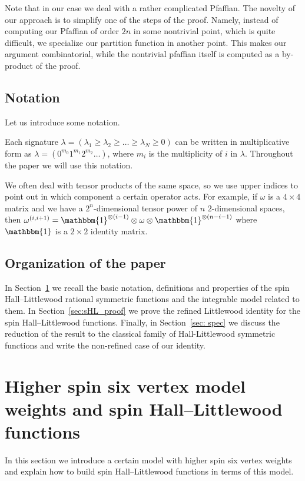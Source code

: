 Note that in our case we deal with a rather complicated Pfaffian. The novelty of our approach is to simplify one of the steps of the proof. Namely, instead of computing our Pfaffian of order $2n$ in some nontrivial point, which is quite difficult, we specialize our partition function in another point. This makes our argument combinatorial, while the nontrivial pfaffian itself is computed as a by-product of the proof.


\subsection{Notation}
\label{sec:not}

Let us introduce some notation.

Each signature $\lambda=(\lambda_1\ge \lambda_2\ge \ldots\ge \lambda_N\ge0 )$ can be written in multiplicative form as $\lambda=(0^{m_0} 1^{m_1} 2^{m_2} \dots)$, where $m_i$ is the multiplicity of $i$ in $\lambda$. Throughout the paper we will use this notation.

We often deal with tensor products of the same space, so we use upper indices to point out in which component a certain operator acts. For example, if $\omega$ is a  $4\times4$ matrix and we have a $2^n$-dimensional tensor power of $n$ $2$-dimensional spaces, then $\omega^{(i, {i+1})}= \mathbbm{1}^{\otimes ({i - 1})} \otimes \omega \otimes \mathbbm{1}^{\otimes ({n - i - 1})}$ where $\mathbbm{1}$  is a $2\times2$ identity matrix.


\subsection{Organization of the paper} In Section~\ref{sec:vertex_and_sHL} we recall the basic notation,
definitions and properties of the spin Hall--Littlewood rational symmetric functions and the integrable model related to them.
In Section~\ref{sec:sHL_proof} we prove the refined Littlewood identity 
for the spin Hall--Littlewood functions.
Finally, in Section~\ref{sec: spec}
we discuss the reduction of the result to the classical family of Hall-Littlewood symmetric functions and write the non-refined case of our identity.


\section{Higher spin six vertex model weights and spin Hall--Littlewood functions} \label{sec:vertex_and_sHL}

In this section we introduce a certain model with higher spin six vertex weights and explain how to build spin Hall--Littlewood functions in terms of this model.

